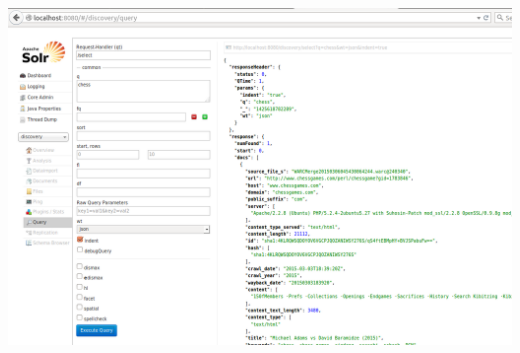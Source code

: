 \newpage
\begin{minipage}{\linewidth}
	\includegraphics[scale=0.55]{figures/query/query_chess.PNG}
	\label{query_chess}
\end{minipage}


